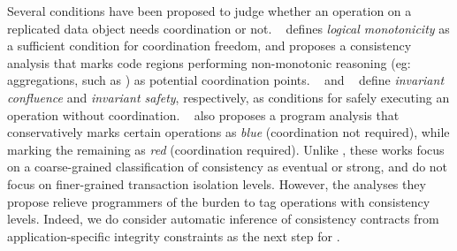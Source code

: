 Several conditions have been proposed to judge whether an operation on
a replicated data object needs coordination or not. ~\cite{Calm}
defines \emph{logical monotonicity} as a sufficient condition for
coordination freedom, and proposes a consistency analysis that marks
code regions performing non-monotonic reasoning (eg: aggregations,
such as ) as potential coordination points.
~\cite{IConfluence} and ~\cite{Sieve} define \emph{invariant
confluence} and \emph{invariant safety}, respectively, as conditions
for safely executing an operation without coordination. ~\cite{Sieve}
also proposes a program analysis that conservatively marks certain
operations as \emph{blue} (coordination not required), while marking
the remaining as \emph{red} (coordination required). Unlike \name,
these works focus on a coarse-grained classification of consistency as
eventual or strong, and do not focus on finer-grained transaction
isolation levels. However, the analyses they propose relieve
programmers of the burden to tag operations with consistency levels.
Indeed, we do consider automatic inference of consistency contracts
from application-specific integrity constraints as the next step for
\name.
